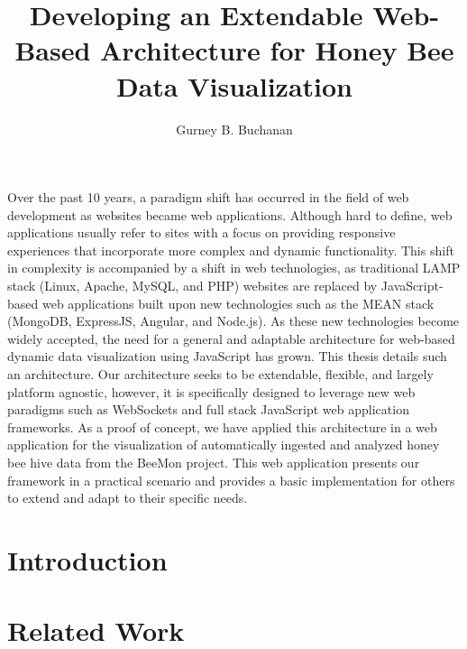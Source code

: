\documentclass[12pt]{asu}
\title{Developing an Extendable Web-Based Architecture for Honey Bee Data Visualization}
\author{Gurney B. Buchanan}
\begin{document}
	\begin{preliminary}
		\maketitle
		\makeapproval
		\makecopyright
		Over the past 10 years, a paradigm shift has occurred in the field of web development as websites became web applications.   Although hard to define, web applications usually refer to sites with a focus on providing responsive experiences that incorporate more complex and dynamic functionality.  This shift in complexity is accompanied by a shift in web technologies, as traditional LAMP stack (Linux, Apache, MySQL, and PHP) websites are replaced by JavaScript-based web applications built upon new technologies such as the MEAN stack (MongoDB, ExpressJS, Angular, and Node.js).  As these new technologies become widely accepted, the need for a general and adaptable architecture for web-based dynamic data visualization using JavaScript has grown.  This thesis details such an architecture. Our architecture seeks to be extendable, flexible, and largely platform agnostic, however, it is specifically designed to leverage new web paradigms such as WebSockets and full stack JavaScript web application frameworks.  As a proof of concept, we have applied this architecture in a web application for the visualization of automatically ingested and analyzed honey bee hive data from the BeeMon project.  This web application presents our framework in a practical scenario and provides a basic implementation for others to extend and adapt to their specific needs.
		\begin{abstract}
		\end{abstract}
		\tableofcontents
		\listoftables
		\listoffigures
	\end{preliminary}



	\chapter[Introduction]{\centering Introduction}
    	 \label{intro}

\chapter[Related Work]{\centering Related Work} \label{relwork}
			 \label{relwork}
\end{document}
